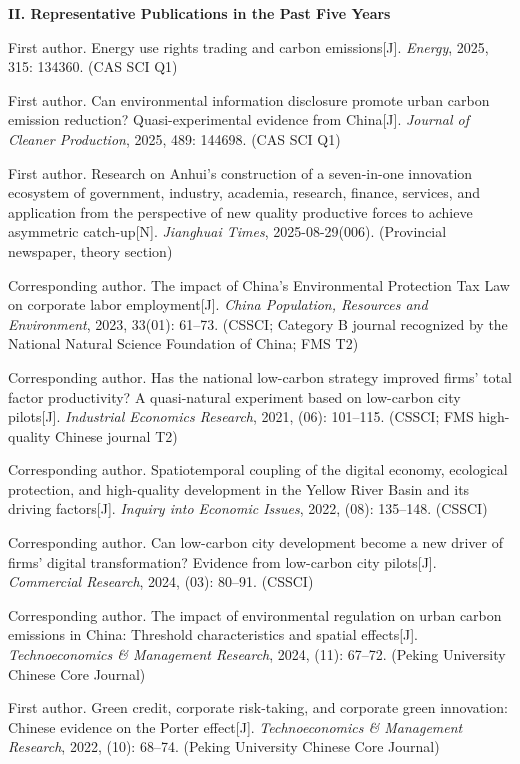 \documentclass[10pt,a4paper]{article}
\newcommand{\cvsection}[1]{%
  \Needspace{7\baselineskip}%
  \vspace{0.52em plus 0.10em minus 0.05em}%
  \noindent\begingroup\color{cvaccent}\bfseries\large #1\endgroup\par\vspace{0.10em}%
  \noindent{\color{cvaccent}\rule{1.55cm}{1.15pt}}{\color{cvline}\rule{\dimexpr\linewidth-1.55cm\relax}{0.45pt}}\par
  \vspace{0.22em plus 0.04em minus 0.03em}%
}
\newenvironment{cvpubs}{\begin{enumerate}[label={\color{cvaccent}[\arabic*]},leftmargin=2.40em,labelsep=0.60em,align=left]}{\end{enumerate}}
\begin{document}
\cvsection{II. Representative Publications in the Past Five Years}

\begin{cvpubs}
\item First author. Energy use rights trading and carbon emissions[J]. \textit{Energy}, 2025, 315: 134360. (CAS SCI Q1)
\item First author. Can environmental information disclosure promote urban carbon emission reduction? Quasi-experimental evidence from China[J]. \textit{Journal of Cleaner Production}, 2025, 489: 144698. (CAS SCI Q1)
\item First author. Research on Anhui's construction of a seven-in-one innovation ecosystem of government, industry, academia, research, finance, services, and application from the perspective of new quality productive forces to achieve asymmetric catch-up[N]. \textit{Jianghuai Times}, 2025-08-29(006). (Provincial newspaper, theory section)
\item Corresponding author. The impact of China's Environmental Protection Tax Law on corporate labor employment[J]. \textit{China Population, Resources and Environment}, 2023, 33(01): 61--73. (CSSCI; Category B journal recognized by the National Natural Science Foundation of China; FMS T2)
\item Corresponding author. Has the national low-carbon strategy improved firms' total factor productivity? A quasi-natural experiment based on low-carbon city pilots[J]. \textit{Industrial Economics Research}, 2021, (06): 101--115. (CSSCI; FMS high-quality Chinese journal T2)
\item Corresponding author. Spatiotemporal coupling of the digital economy, ecological protection, and high-quality development in the Yellow River Basin and its driving factors[J]. \textit{Inquiry into Economic Issues}, 2022, (08): 135--148. (CSSCI)
\item Corresponding author. Can low-carbon city development become a new driver of firms' digital transformation? Evidence from low-carbon city pilots[J]. \textit{Commercial Research}, 2024, (03): 80--91. (CSSCI)
\item Corresponding author. The impact of environmental regulation on urban carbon emissions in China: Threshold characteristics and spatial effects[J]. \textit{Technoeconomics \& Management Research}, 2024, (11): 67--72. (Peking University Chinese Core Journal)
\item First author. Green credit, corporate risk-taking, and corporate green innovation: Chinese evidence on the Porter effect[J]. \textit{Technoeconomics \& Management Research}, 2022, (10): 68--74. (Peking University Chinese Core Journal)
\end{cvpubs}
\end{document}
